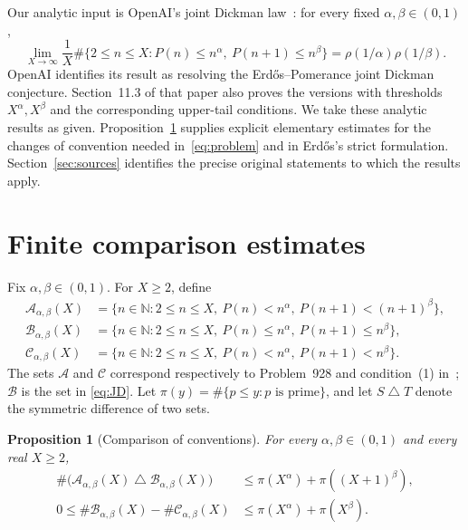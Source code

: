 \documentclass[11pt,a4paper]{amsart}
\newtheorem{proposition}{Proposition}
\newcommand{\N}{\mathbb N}
\newcommand{\A}{\mathcal A}
\newcommand{\B}{\mathcal B}
\newcommand{\C}{\mathcal C}
\begin{document}
Our analytic input is OpenAI's joint Dickman
law~\cite[Theorem~1.1, p.~2]{OpenAI2026}: for every fixed
$\alpha,\beta\in(0,1)$,
\begin{equation}\label{eq:JD}
 \lim_{X\to\infty}\frac1X
 \#\{2\le n\le X:P(n)\le n^\alpha,\ P(n+1)\le n^\beta\}
 =\rho(1/\alpha)\rho(1/\beta).
\end{equation}
OpenAI identifies its result as resolving the
Erd\H{o}s--Pomerance joint Dickman conjecture. Section~11.3 of that
paper also proves the versions with thresholds $X^\alpha,X^\beta$ and
the corresponding upper-tail conditions. We take these analytic results
as given. Proposition~\ref{prop:comparison} supplies explicit elementary
estimates for the changes of convention needed in~\eqref{eq:problem}
and in Erd\H{o}s's strict formulation. Section~\ref{sec:sources} identifies
the precise original statements to which the results apply.

\section{Finite comparison estimates}\label{sec:comparison}

Fix $\alpha,\beta\in(0,1)$. For $X\ge2$, define
\begin{align*}
 \A_{\alpha,\beta}(X)
   &=\{n\in\N:2\le n\le X,\ P(n)<n^\alpha,
                                \ P(n+1)<(n+1)^\beta\},\\
 \B_{\alpha,\beta}(X)
   &=\{n\in\N:2\le n\le X,\ P(n)\le n^\alpha,
                                \ P(n+1)\le n^\beta\},\\
 \C_{\alpha,\beta}(X)
   &=\{n\in\N:2\le n\le X,\ P(n)<n^\alpha,
                                \ P(n+1)<n^\beta\}.
\end{align*}
The sets $\A$ and $\C$ correspond respectively to Problem~928 and
condition~(1) in~\cite[p.~25]{Erdos1976Manitoba}; $\B$ is the set in
\eqref{eq:JD}. Let $\pi(y)=\#\{p\le y:p\text{ is prime}\}$, and let
$S\mathbin\triangle T$ denote the symmetric difference of two sets.

\begin{proposition}[Comparison of conventions]\label{prop:comparison}
For every $\alpha,\beta\in(0,1)$ and every real $X\ge2$,
\begin{align}
 \#\bigl(\A_{\alpha,\beta}(X)\mathbin\triangle
          \B_{\alpha,\beta}(X)\bigr)
 &\le \pi(X^\alpha)+\pi((X+1)^\beta),\label{eq:AB}\\
 0\le\#\B_{\alpha,\beta}(X)-\#\C_{\alpha,\beta}(X)
 &\le \pi(X^\alpha)+\pi(X^\beta).\label{eq:BC}
\end{align}
\end{proposition}
\end{document}
